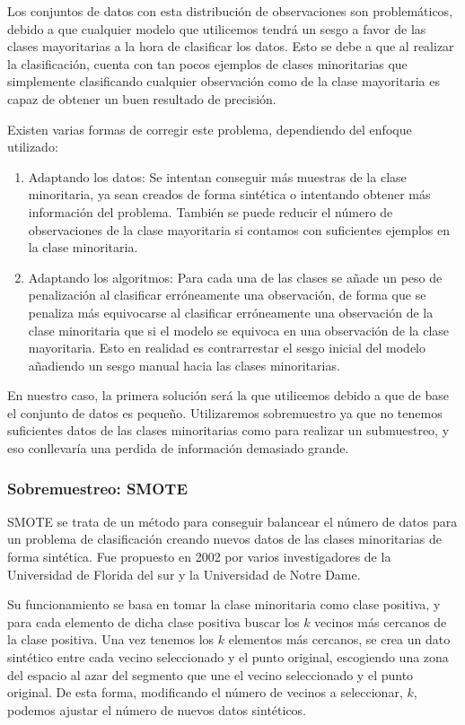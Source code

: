 Los conjuntos de datos con esta distribución de observaciones son problemáticos, debido a que cualquier modelo que utilicemos tendrá un sesgo a favor de las clases mayoritarias a la hora de clasificar los datos. Esto se debe a que al realizar la clasificación, cuenta con tan pocos ejemplos de clases minoritarias que simplemente clasificando cualquier observación como de la clase mayoritaria es capaz de obtener un buen resultado de precisión.

Existen varias formas de corregir este problema, dependiendo del enfoque utilizado:

\begin{enumerate}
	\item Adaptando los datos: Se intentan conseguir más muestras de la clase minoritaria, ya sean creados de forma sintética o intentando obtener más información del problema. También se puede reducir el número de observaciones de la clase mayoritaria si contamos con suficientes ejemplos en la clase minoritaria.
	\item Adaptando los algoritmos: Para cada una de las clases se añade un peso de penalización al clasificar erróneamente una observación, de forma que se penaliza más equivocarse al clasificar erróneamente una observación de la clase minoritaria que si el modelo se equivoca en una observación de la clase mayoritaria. Esto en realidad es contrarrestar el sesgo inicial del modelo añadiendo un sesgo manual hacia las clases minoritarias.
\end{enumerate}

En nuestro caso, la primera solución será la que utilicemos debido a que de base el conjunto de datos es pequeño. Utilizaremos sobremuestro ya que no tenemos suficientes datos de las clases minoritarias como para realizar un submuestreo, y eso conllevaría una perdida de información demasiado grande.

\subsubsection{Sobremuestreo: SMOTE}

SMOTE \cite{SMOTE} se trata de un método para conseguir balancear el número de datos para un problema de clasificación creando nuevos datos de las clases minoritarias de forma sintética. Fue propuesto en 2002 por varios investigadores de la Universidad de Florida del sur y la Universidad de Notre Dame.

Su funcionamiento se basa en tomar la clase minoritaria como clase positiva, y para cada elemento de dicha clase positiva buscar los $k$ vecinos más cercanos de la clase positiva. Una vez tenemos los $k$ elementos más cercanos, se crea un dato sintético entre cada vecino seleccionado y el punto original, escogiendo una zona del espacio al azar del segmento que une el vecino seleccionado y el punto original. De esta forma, modificando el número de vecinos a seleccionar, $k$, podemos ajustar el número de nuevos datos sintéticos.

